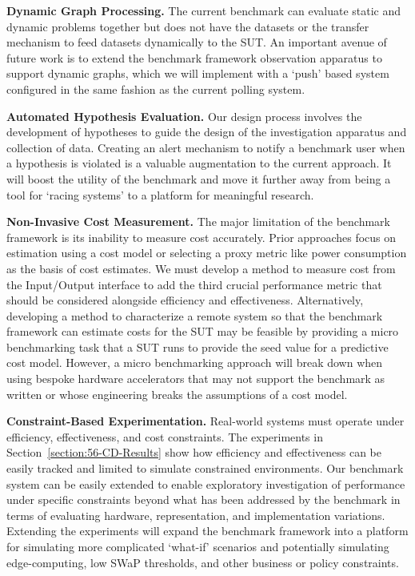 \textbf{Dynamic Graph Processing.}
The current \gai benchmark can evaluate static and dynamic problems together but does not have the datasets or the transfer mechanism to feed datasets dynamically to the \ac{SUT}.
An important avenue of future work is to extend the \gai benchmark framework observation apparatus to support dynamic graphs, which we will implement with a `push' based system configured in the same fashion as the current polling system.

\textbf{Automated Hypothesis Evaluation.}
Our design process involves the development of hypotheses to guide the design of the investigation apparatus and collection of data. 
Creating an alert mechanism to notify a benchmark user when a hypothesis is violated is a valuable augmentation to the current approach. 
It will boost the utility of the benchmark and move it further away from being a tool for `racing systems' to a platform for meaningful research.

\textbf{Non-Invasive Cost Measurement.}
The major limitation of the \gai benchmark framework is its inability to measure cost accurately.
Prior approaches focus on estimation using a cost model or selecting a proxy metric like power consumption as the basis of cost estimates. 
We must develop a method to measure cost from the Input/Output interface to add the third crucial performance metric that should be considered alongside efficiency and effectiveness.
Alternatively, developing a method to characterize a remote system so that the benchmark framework can estimate costs for the \ac{SUT} may be feasible by providing a micro benchmarking task that a \ac{SUT} runs to provide the seed value for a predictive cost model.
However, a micro benchmarking approach will break down when using bespoke hardware accelerators that may not support the benchmark as written or whose engineering breaks the assumptions of a cost model. 

\textbf{Constraint-Based Experimentation.}
Real-world \gai systems must operate under efficiency, effectiveness, and cost constraints. 
The experiments in Section~\ref{section:56-CD-Results} show how efficiency and effectiveness can be easily tracked and limited to simulate constrained environments. 
Our \gai benchmark system can be easily extended to enable exploratory investigation of \gai performance under specific constraints beyond what has been addressed by the benchmark in terms of evaluating hardware, representation, and implementation variations.
Extending the experiments will expand the \gai benchmark framework into a platform for simulating more complicated `what-if' scenarios and potentially simulating edge-computing, low \ac{SWaP} thresholds, and other business or policy constraints.

